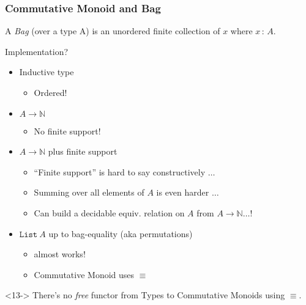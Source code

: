 \documentclass[serif,mathserif,professionalfont,10pt]{beamer}
\begin{document}
\begin{frame}
\frametitle{Commutative Monoid and Bag}
\begin{definition}
A \emph{Bag} (over a type A) is an unordered finite collection
of $x$ where $x\,:\,A$.
\end{definition}
\pause
Implementation?
\begin{itemize}
\item<2-> Inductive type
\begin{itemize}
\item<3-> Ordered!
\end{itemize}
\item<4-> $A \rightarrow \mathbb{N}$
\begin{itemize}
\item<5-> No finite support!
\end{itemize}
\item<6-> $A \rightarrow \mathbb{N}$ plus finite support
\begin{itemize}
\item<7-> ``Finite support'' is hard to say constructively $\ldots$
\item<8-> Summing over all elements of $A$ is even harder $\ldots$
\item<9-> Can build a decidable equiv. relation on $A$ from $A \rightarrow \mathbb{N} \ldots$!
\end{itemize}
\item<10-> $\texttt{List}\ A$ up to bag-equality (aka permutations)
\begin{itemize}
\item<11-> almost works!
\item<12-> Commutative Monoid uses $\equiv$
\end{itemize}
\end{itemize}
\begin{theorem}<13->
  There's no \emph{free} functor from Types to Commutative Monoids using $\equiv$.
\end{theorem}
\end{frame}
\end{document}
